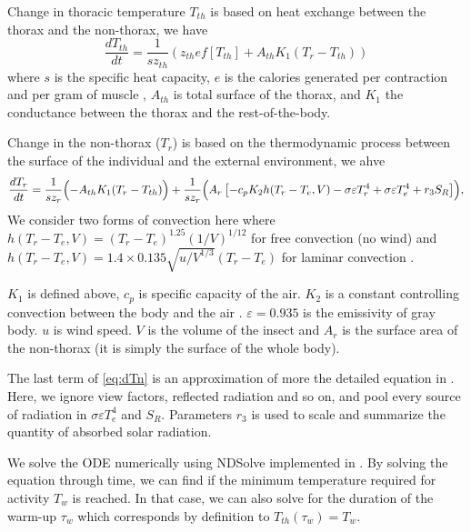 Change in thoracic temperature $T_{th}$ is based on heat exchange between the thorax and the non-thorax, we have 
\begin{equation} \label{eq:dTh}
	\frac{dT_{th}}{dt} = \frac{1}{s z_{th}} (z_{th} e f[T_{th}] +  A_{th} K_1(T_r - T_{th}))
\end{equation}
where $s$ is the specific heat capacity, $e$ is the calories generated per contraction and per gram of muscle \citep{Kammer1974}, $A_{th}$ is total surface of the thorax, and $K_1$ the conductance between the thorax and the rest-of-the-body.

Change in the  non-thorax ($T_r$) is based on the thermodynamic process between the surface of the individual and the external environment, we ahve
\begin{equation} \label{eq:dTn} 
		\frac{dT_r}{dt} =  \frac{1}{s z_{r}} \Bigl( - A_{th} K_1(T_r - T_{th})  \Bigr)
			+ \frac{1}{s z_{r}} \Bigl( A_r \left[ - c_p K_2 h(T_r -T_e, V)- \sigma \varepsilon T_r^4 + \sigma \varepsilon T_e^4  + r_3 S_R  \right] \Bigr),
\end{equation}
We consider two forms of convection here where $ h(T_r -T_e, V) = (T_r- T_e)^{1.25} (1/V)^{1/12 }$ for free convection (no wind) and $ h(T_r -T_e, V) =  1.4 \times 0.135 \sqrt{u/V^{1/3}} (T_r- T_e) $ for laminar convection \citep{Campbell2012}.

$K_1$ is defined above, $c_p$ is specific capacity of the air. 
$K_2$ is a constant controlling convection between the body and the air \citep{Campbell2012}.
$\varepsilon = 0.935$  is the emissivity of gray body.
$u$ is wind speed.
$V$ is the volume of the insect and $A_r$ is the surface area of the  non-thorax (it is simply the surface of the whole body).

The last term of \cref{eq:dTn}  is an approximation of more the detailed equation in \citet{Campbell2012}.
Here, we ignore view factors, reflected radiation and so on, and pool every source of radiation in $ \sigma \varepsilon T_e^4$ and $S_R$. 
Parameters $r_3$ is used to scale and summarize the quantity of absorbed solar radiation.

We solve the ODE numerically using NDSolve implemented in \citet{Mathematica10}.
By solving the equation through time, we can find if the minimum temperature  required for activity $T_w$ is reached.
In that case, we can also solve for the duration of the warm-up $\tau_w$ which corresponds by definition to $T_{th}(\tau_w) = T_w$. 

